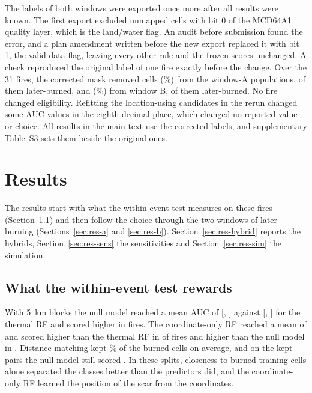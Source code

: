 \documentclass[preprint,12pt,authoryear]{elsarticle}
\begin{document}
The labels of both windows were exported once more after all results were known. The first export excluded unmapped cells with bit 0 of the MCD64A1 quality layer, which is the land/water flag. An audit before submission found the error, and a plan amendment written before the new export replaced it with bit 1, the valid-data flag, leaving every other rule and the frozen scores unchanged. A check reproduced the original label of one fire exactly before the change. Over the 31 fires, the corrected mask removed \sQaCellsA{} cells (\sQaPctA\%) from the window-A populations, \sQaBurnedA{} of them later-burned, and \sQaCellsB{} (\sQaPctB\%) from window B, \sQaBurnedB{} of them later-burned. No fire changed eligibility. Refitting the location-using candidates in the rerun changed some AUC values in the eighth decimal place, which changed no reported value or choice. All results in the main text use the corrected labels, and supplementary Table~S3 sets them beside the original ones.

\section{Results}
\label{sec:results}

The results start with what the within-event test measures on these fires (Section~\ref{sec:res-diag}) and then follow the choice through the two windows of later burning (Sections~\ref{sec:res-a} and \ref{sec:res-b}). Section~\ref{sec:res-hybrid} reports the hybrids, Section~\ref{sec:res-sens} the sensitivities and Section~\ref{sec:res-sim} the simulation.

\subsection{What the within-event test rewards}
\label{sec:res-diag}

With 5~km blocks the null model reached a mean AUC of \vaucNullFive{} [\vaucNullFiveLo, \vaucNullFiveHi] against \vaucRfFive{} [\vaucRfFiveLo, \vaucRfFiveHi] for the thermal RF and scored higher in \vnullWinsFive{} fires. The coordinate-only RF reached a mean of \sAllFocCoord{} and scored higher than the thermal RF in \sAllCoordChose{} of \sAllN{} fires and higher than the null model in \sAllCoordBeatsNull{}. Distance matching kept \vpwdKeptFive\% of the burned cells on average, and on the kept pairs the null model still scored \vpwdNullFive{}. In these splits, closeness to burned training cells alone separated the classes better than the predictors did, and the coordinate-only RF learned the position of the scar from the coordinates.
\end{document}
